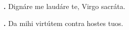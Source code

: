 \textbf{\Vbar.} Dignáre me laudáre te, Virgo sacráta.

\textbf{\Rbar.} Da mihi virtútem contra hostes tuos.

